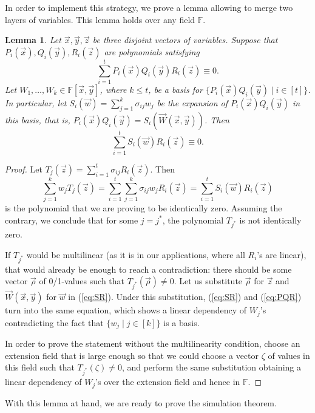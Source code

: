 \documentclass[11pt]{article}
\numberwithin{equation}{section}
\newtheorem{lemma}[theorem]{Lemma}
\begin{document}
In order to implement this strategy,
we prove a lemma allowing to merge two layers of variables.
This lemma holds over any field $\mathbb{F}$.
\begin{lemma} \label{lem:merging-two-levels}
Let $\vec{x},\vec{y},\vec{z}$ be three disjoint vectors of variables. Suppose that $P_i(\vec{x}),Q_i(\vec{y}),R_i(\vec{z})$ are polynomials satisfying
\begin{equation} \label{eq:PQR}
 \sum_{i=1}^t P_i(\vec{x}) Q_i(\vec{y}) R_i(\vec{z}) \equiv 0.
\end{equation}
Let $W_1,\dotsc,W_k\in\mathbb{F}[\vec{x},\vec{y}]$, where $k \leq t$, be a basis for $\{P_i(\vec{x}) Q_i(\vec{y}) \mid i \in [t]\}$. In particular, let $S_i(\vec w)=\sum_{j=1}^k \sigma_{ij} w_j$ be the expansion of $P_i(\vec{x}) Q_i(\vec{y})$ in this basis, that is, $P_i(\vec{x}) Q_i(\vec{y})=S_i(\vec W(\vec{x},\vec{y}))$. Then
\begin{equation} \label{eq:SR}
 \sum_{i=1}^t S_i(\vec{w}) R_i(\vec{z}) \equiv 0.
\end{equation}
\end{lemma}
\begin{proof}
Let $T_j(\vec z)=\sum_{i=1}^t \sigma_{ij}R_i(\vec z)$.
Then 
\[
\sum_{j=1}^k w_jT_j(\vec z) = \sum_{i=1}^t\sum_{j=1}^k \sigma_{ij}w_jR_i(\vec z)=\sum_{i=1}^t S_i(\vec w)R_i(\vec z)
\]
is the polynomial that we are proving to be identically zero.
Assuming the contrary, we conclude that for some $j=j^*$, the polynomial
$T_{j^*}$ is not identically zero.

If $T_{j^*}$ would be multilinear (as it is in our applications, where all $R_i$'s are linear), 
that would already
be enough to reach a contradiction: there should be some vector $\vec\rho$ of 0/1-values 
such that $T_{j^*}(\vec\rho)\neq 0$. Let us substitute $\vec\rho$ for $\vec z$
and $\vec W(\vec x,\vec y)$ for $\vec w$ in (\ref{eq:SR}).
Under this substitution, (\ref{eq:SR}) and (\ref{eq:PQR}) turn into the same equation,
which shows a linear dependency of $W_j$'s
contradicting the fact that $\{w_j \mid j\in[k]\}$ is a basis. 

In order to prove the statement without the multilinearity condition,
choose an extension field that is large enough so that we could choose
a vector $\zeta$ of values in this field such that $T_{j^*}(\zeta)\neq 0$,
and perform the same substitution obtaining a linear dependency
of $W_j$'s over the extension field and hence in $\mathbb{F}$.
\end{proof}

With this lemma at hand, we are ready to prove the simulation
theorem.
\end{document}
